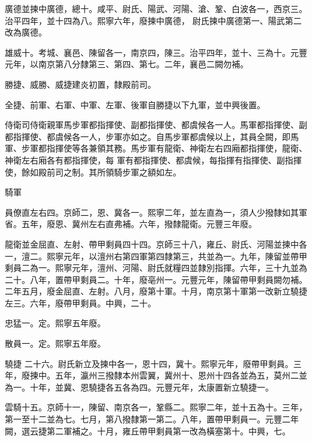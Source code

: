 \begin{pinyinscope}
 廣德並揀中廣德，總十。咸平、尉氏、陽武、河陽、滄、鞏、白波各一，西京三。治平四年，並十四為八。熙寧六年，廢揀中廣德，
 尉氏揀中廣德第一、陽武第二改為廣德。



 雄威十。考城、襄邑、陳留各一，南京四，陳三。治平四年，並十、三為十。元豐元年，以南京第八分隸第三、第四、第七。二年，襄邑二闕勿補。



 勝捷、威勝、威捷建炎初置，隸殿前司。



 全捷、前軍、右軍、中軍、左軍、後軍自勝捷以下九軍，並中興後置。



 侍衛司侍衛親軍馬步軍都指揮使、副都指揮使、都虞候各一人。馬軍都指揮使、副都指揮使、都虞候各一人，步軍亦如之。自馬步軍都虞候以上，其員全闕，即馬軍、步軍都指揮使等各兼領其務。馬步軍有龍衛、神衛左右四廂都指揮使，龍衛、神衛左右廂各有都指揮使，每
 軍有都指揮使、都虞候，每指揮有指揮使、副指揮使，餘如殿前司之制。其所領騎步軍之額如左。



 騎軍



 員僚直左右四。京師二，恩、冀各一。熙寧二年，並左直為一，須人少撥隸如其軍省。五年，廢恩、冀州左右直弗補。六年，撥隸龍衛。元豐三年廢。



 龍衛並金屈直、左射、帶甲剩員四十四。京師三十八，雍丘、尉氏、河陽並揀中各一，澶二。熙寧元年，以澶州右第四軍第四隸第三，共並為一。九年，陳留並帶甲剩員二為一。熙寧元年，澶州、河陽、尉氏就糧四並隸別指揮。六年，三十九並為二十。八年，置帶甲剩員二。十年，廢亳州一。元豐元年，陳留帶甲剩員闕勿補。二年五月，廢金屈直、左射。八月，廢第十軍。十月，南京第十軍第一改新立驍捷左三。六年，廢帶甲剩員。中興，二十。



 忠猛一。定。熙寧五年廢。



 散員一。定。熙寧五年廢。



 驍捷
 二十六。尉氏新立及揀中各一，恩十四，冀十。熙寧元年，廢帶甲剩員。三年，廢揀中。五年，瀛州三撥隸本州雲翼，冀州十、恩州十四各並為五，莫州二並為一。十年，並冀、恩驍捷各五各為四。元豐元年，太康置新立驍捷一。



 雲騎十五。京師十一，陳留、南京各一，鞏縣二。熙寧二年，並十五為十。三年，第一至十二並為七。七月，第八撥隸第一第二。八年，置帶甲剩員一。元豐二年闕，選云捷第二軍補之。十月，雍丘帶甲剩員第一改為橫塞第十。中興，七。




\end{pinyinscope}
